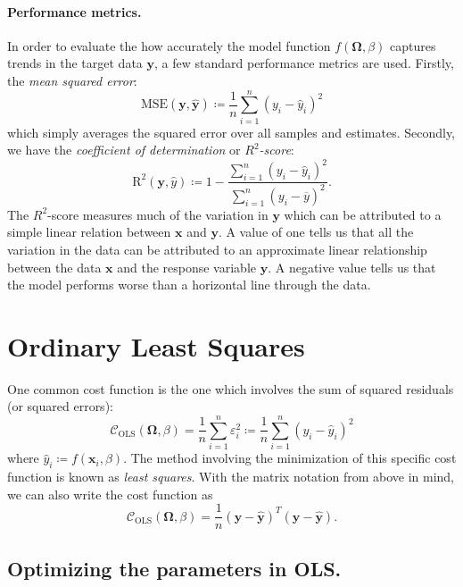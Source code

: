 \documentclass[dvipsnames, article, a4paper, oneside, 12pt]{memoir}
\newcommand{\x}{\bm{x}}
\newcommand{\MSE}[1]{\mathrm{MSE}(#1)}
\newcommand{\R}[1]{\mathrm{R}^2(#1)}
\newcommand{\OLS}{\mathrm{OLS}}
\newcommand{\y}{\bm{y}}
\newcommand{\data}{\bm{\Omega}}
\newcommand{\cost}{\mathcal{C}}
\begin{document}
  \paragraph{Performance metrics.}
  In order to evaluate the how accurately the model function \( f(\data, \beta)
  \) captures trends in the target data \( \y \), a few standard performance
  metrics are  used.  Firstly, the \emph{mean squared error}:
  \begin{equation}
    \MSE{\y, \hat{\y}} \coloneqq \frac{1}{n} \sum_{i=1}^n (y_i - \hat{y}_i)^2
  \end{equation}
  which simply averages the squared error over all samples and estimates.
  Secondly, we have the \emph{coefficient of determination} or
  \emph{\(R^2\)-score}:
  \begin{equation}
    \R{\y, \hat{y}} \coloneqq 1 - \frac{\sum_{i=1}^n (y_i -
    \hat{y}_i)^2}{\sum_{i=1}^n (y_i - \overline{y})^2}.
  \end{equation}
  The \(R^2\)-score measures much of the variation in \( \y \) which can be
  attributed to a simple linear relation between \( \x \) and \( \y \).  A
  value of one tells us that all the variation in the data can be attributed to
  an approximate linear relationship between the data \(\x\) and the response
  variable \( \y \). A negative value tells us that the model performs worse
  than a horizontal line through the data.

  \section{Ordinary Least Squares}
  
  One common cost function is the one which involves the sum of squared
  residuals (or squared errors):
  \begin{equation}
    \label{eq:mse}
    \cost_\OLS(\data, \beta) = \frac{1}{n}\sum_{i = 1}^n \varepsilon_i^2 \coloneqq \frac{1}{n}\sum_{i=1}^n (y_i - \hat{y}_i)^2
  \end{equation}
  where \( \hat{y}_i \coloneqq f(\x_i, \beta) \). The method involving the
  minimization of this specific cost function is known as \emph{least squares}.
  With the matrix notation from above in mind, we can also write the cost
  function as
  \begin{equation}
    \cost_\OLS(\data, \beta) = \frac{1}{n} (\y - \hat{\y})^T (\y - \hat{\y}).
  \end{equation}

  

  \subsection{Optimizing the parameters in OLS.}
  
\end{document}
